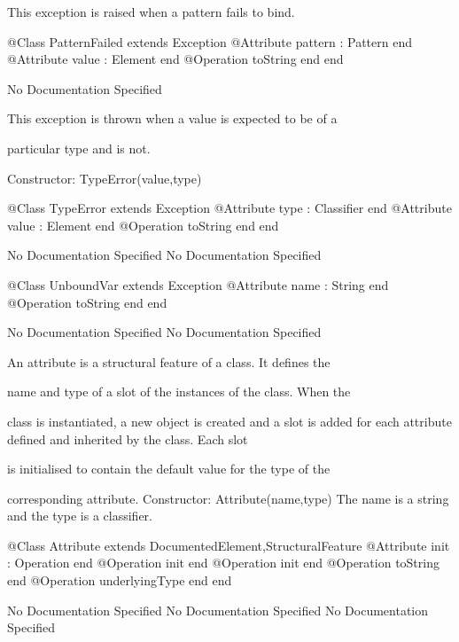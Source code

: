       This exception is raised when a pattern fails to bind.
\begin{Interface}
@Class PatternFailed extends Exception
  @Attribute pattern : Pattern end
  @Attribute value : Element end
  @Operation toString end
end
\end{Interface}
No Documentation Specified

      This exception is thrown when a value is expected to be of a

      particular type and is not.
      
        Constructor: TypeError(value,type)
\begin{Interface}
@Class TypeError extends Exception
  @Attribute type : Classifier end
  @Attribute value : Element end
  @Operation toString end
end
\end{Interface}
No Documentation Specified
No Documentation Specified
\begin{Interface}
@Class UnboundVar extends Exception
  @Attribute name : String end
  @Operation toString end
end
\end{Interface}
No Documentation Specified
No Documentation Specified

     An attribute is a structural feature of a class. It defines the

     name and type of a slot of the instances of the class. When the

     class is instantiated, a new object is created and a slot is added 
     for each attribute defined and inherited by the class. Each slot

     is initialised to contain the default value for the type of the

     corresponding attribute.
     Constructor: Attribute(name,type)
     The name is a string and the type is a classifier.
\begin{Interface}
@Class Attribute extends DocumentedElement,StructuralFeature
  @Attribute init : Operation end
  @Operation init end
  @Operation init end
  @Operation toString end
  @Operation underlyingType end
end
\end{Interface}
No Documentation Specified
No Documentation Specified
No Documentation Specified

